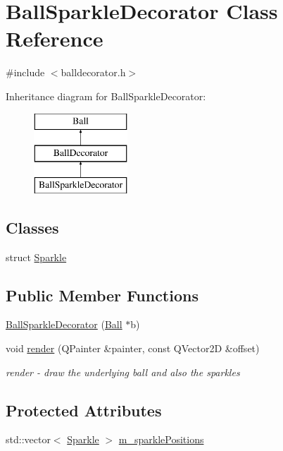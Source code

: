 \hypertarget{class_ball_sparkle_decorator}{}\section{Ball\+Sparkle\+Decorator Class Reference}
\label{class_ball_sparkle_decorator}


{\ttfamily \#include $<$balldecorator.\+h$>$}

Inheritance diagram for Ball\+Sparkle\+Decorator\+:\begin{figure}[H]
\begin{center}
\leavevmode
\includegraphics[height=3.000000cm]{class_ball_sparkle_decorator}
\end{center}
\end{figure}
\subsection*{Classes}
\begin{DoxyCompactItemize}
\item 
struct \mbox{\hyperlink{struct_ball_sparkle_decorator_1_1_sparkle}{Sparkle}}
\end{DoxyCompactItemize}
\subsection*{Public Member Functions}
\begin{DoxyCompactItemize}
\item 
\mbox{\hyperlink{class_ball_sparkle_decorator_aebdaa2c5204a050a297c9255d885d0c3}{Ball\+Sparkle\+Decorator}} (\mbox{\hyperlink{class_ball}{Ball}} $\ast$b)
\item 
void \mbox{\hyperlink{class_ball_sparkle_decorator_a3f292b99228264bee08c672184ab6ad5}{render}} (Q\+Painter \&painter, const Q\+Vector2D \&offset)
\begin{DoxyCompactList}\small\item\em render -\/ draw the underlying ball and also the sparkles \end{DoxyCompactList}\end{DoxyCompactItemize}
\subsection*{Protected Attributes}
\begin{DoxyCompactItemize}
\item 
std\+::vector$<$ \mbox{\hyperlink{struct_ball_sparkle_decorator_1_1_sparkle}{Sparkle}} $>$ \mbox{\hyperlink{class_ball_sparkle_decorator_a225c9a37159214fbb658148713227fcf}{m\+\_\+sparkle\+Positions}}
\end{DoxyCompactItemize}
